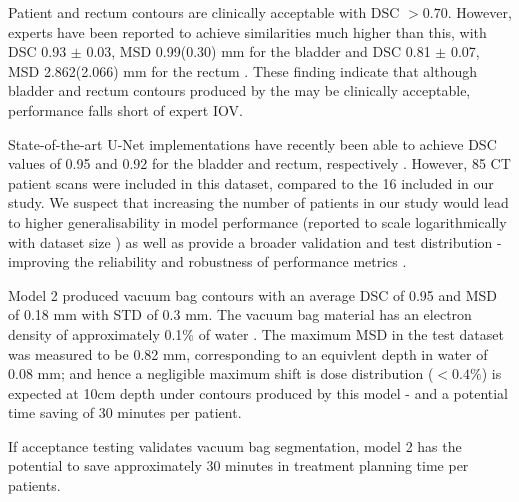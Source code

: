 Patient and rectum contours are clinically acceptable with DSC $>0.70$. However, experts have been reported to achieve similarities much higher than this, with  DSC 0.93 $\pm$ 0.03, MSD 0.99(0.30) mm for the bladder and DSC 0.81 $\pm$ 0.07, MSD 2.862(2.066) mm for the rectum \cite{Roach_2019}. These finding indicate that although bladder and rectum contours produced by the  may be clinically acceptable, performance falls short of expert IOV.

State-of-the-art U-Net implementations have recently been able to achieve DSC values of 0.95 and 0.92 for the bladder and rectum, respectively \cite{Kazemifar_2018}. However, 85 CT patient scans were included in this dataset, compared to the 16 included in our study. We suspect that increasing the number of patients in our study would lead to higher generalisability in model performance (reported to scale logarithmically with dataset size \cite{Nemoto_2020}) as well as provide a broader validation and test distribution - improving the reliability and robustness of performance metrics \cite{Ronneberger_2015}. 

Model 2 produced vacuum bag contours with an average DSC of 0.95 and MSD of 0.18 mm with STD of 0.3 mm. The vacuum bag material has an electron density of approximately 0.1\% of water \cite{Park}. The maximum MSD in the test dataset was measured to be 0.82 mm, corresponding to an equivlent depth in water of 0.08 mm; and hence a negligible maximum shift is dose distribution ($<0.4\%$) is expected at 10cm depth under contours produced by this model - and a potential time saving of 30 minutes per patient.


If acceptance testing validates vacuum bag segmentation, model 2 has the potential to save approximately 30 minutes in treatment planning time per patients.



	
%
%
%



